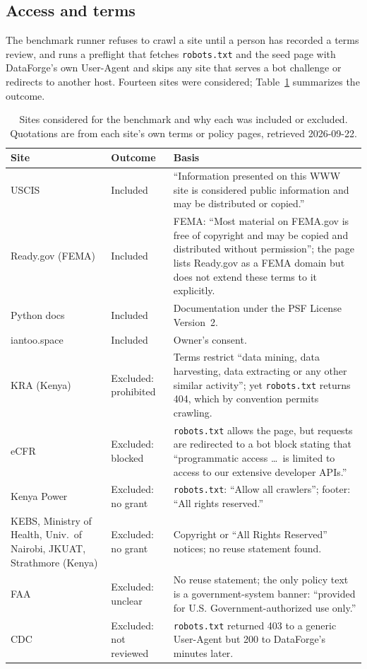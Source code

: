 \documentclass[11pt]{article}
\begin{document}
\subsection{Access and terms}
\label{sec:eval-access}
The benchmark runner refuses to crawl a site until a person has recorded a
terms review, and runs a preflight that fetches \texttt{robots.txt} and the
seed page with DataForge's own User-Agent and skips any site that serves a
bot challenge or redirects to another host. Fourteen sites were considered;
Table~\ref{tab:access} summarizes the outcome.

\begin{table}[h]
  \centering
  \small
  \caption{Sites considered for the benchmark and why each was included or
  excluded. Quotations are from each site's own terms or policy pages,
  retrieved 2026-09-22.}
  \label{tab:access}
  \begin{tabular}{@{}>{\raggedright\arraybackslash}p{3.1cm}
                     >{\raggedright\arraybackslash}p{2.4cm}
                     >{\raggedright\arraybackslash}p{8.6cm}@{}}
    \toprule
    Site & Outcome & Basis \\
    \midrule
    USCIS & Included & ``Information presented on this WWW site is
      considered public information and may be distributed or copied.'' \\
    Ready.gov (FEMA) & Included & FEMA: ``Most material on FEMA.gov is free
      of copyright and may be copied and distributed without permission'';
      the page lists Ready.gov as a FEMA domain but does not extend these
      terms to it explicitly. \\
    Python docs & Included & Documentation under the PSF License Version~2. \\
    iantoo.space & Included & Owner's consent. \\
    \midrule
    KRA (Kenya) & Excluded: prohibited & Terms restrict ``data mining, data
      harvesting, data extracting or any other similar activity''; yet
      \texttt{robots.txt} returns 404, which by convention permits crawling. \\
    eCFR & Excluded: blocked & \texttt{robots.txt} allows the page, but
      requests are redirected to a bot block stating that ``programmatic
      access \ldots\ is limited to access to our extensive developer APIs.'' \\
    Kenya Power & Excluded: no grant & \texttt{robots.txt}: ``Allow all
      crawlers''; footer: ``All rights reserved.'' \\
    KEBS, Ministry of Health, Univ.\ of Nairobi, JKUAT, Strathmore (Kenya)
      & Excluded: no grant & Copyright or ``All Rights Reserved'' notices;
      no reuse statement found. \\
    FAA & Excluded: unclear & No reuse statement; the only policy text is a
      government-system banner: ``provided for U.S. Government-authorized
      use only.'' \\
    CDC & Excluded: not reviewed & \texttt{robots.txt} returned 403 to a
      generic User-Agent but 200 to DataForge's minutes later. \\
    \bottomrule
  \end{tabular}
\end{table}
\end{document}
